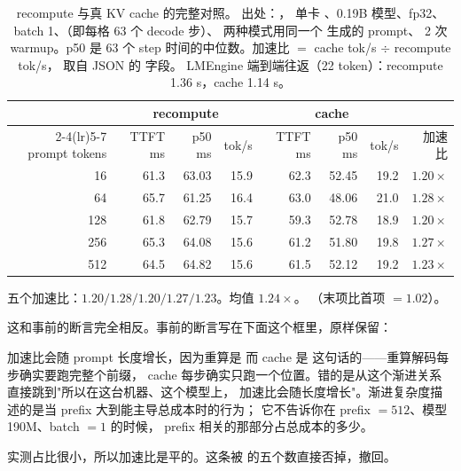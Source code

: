 \begin{table}[htbp]
\centering
\small
\setlength{\tabcolsep}{5pt}
\begin{tabular}{rrrrrrrr}
\toprule
& \multicolumn{3}{c}{recompute} & \multicolumn{3}{c}{cache} & \\
\cmidrule(lr){2-4}\cmidrule(lr){5-7}
prompt tokens & TTFT ms & p50 ms & tok/s & TTFT ms & p50 ms & tok/s & 加速比 \\
\midrule
16  & 61.3 & 63.03 & 15.9 & 62.3 & 52.45 & 19.2 & $1.20\times$ \\
64  & 65.7 & 61.25 & 16.4 & 63.0 & 48.06 & 21.0 & $1.28\times$ \\
128 & 61.8 & 62.79 & 15.7 & 59.3 & 52.78 & 18.9 & $1.20\times$ \\
256 & 65.3 & 64.08 & 15.6 & 61.2 & 51.80 & 19.8 & $1.27\times$ \\
512 & 64.5 & 64.82 & 15.6 & 61.5 & 52.12 & 19.2 & $1.23\times$ \\
\bottomrule
\end{tabular}
\caption{recompute 与真 KV cache 的完整对照。
出处：，
单卡 、0.19B 模型、fp32、batch 1、（即每格 63 个 decode 步）、
两种模式用同一个  生成的 prompt、
2 次 warmup。p50 是 63 个 step 时间的中位数。加速比 $=$ cache tok/s $\div$ recompute tok/s，
取自 JSON 的  字段。
LMEngine 端到端往返（22 token）：recompute 1.36 s，cache 1.14 s。}
\label{tab:kv-bench}
\end{table}

五个加速比：$1.20 / 1.28 / 1.20 / 1.27 / 1.23$。均值 $1.24\times$。
（末项比首项 $=1.02$）。

这和事前的断言完全相反。事前的断言写在下面这个框里，原样保留：

\begin{retraction}{加速比会随 prompt 长度增长，因为重算是  而 cache 是 }
这句话的——重算解码每步确实要跑完整个前缀，
cache 每步确实只跑一个位置。错的是从这个渐进关系直接跳到"所以在这台机器、这个模型上，
加速比会随长度增长"。渐进复杂度描述的是当 prefix 大到能主导总成本时的行为；
它不告诉你在 prefix $=512$、模型 190M、batch $=1$ 的时候，
prefix 相关的那部分占总成本的多少。

实测占比很小，所以加速比是平的。这条被 
的五个数直接否掉，撤回。
\end{retraction}

